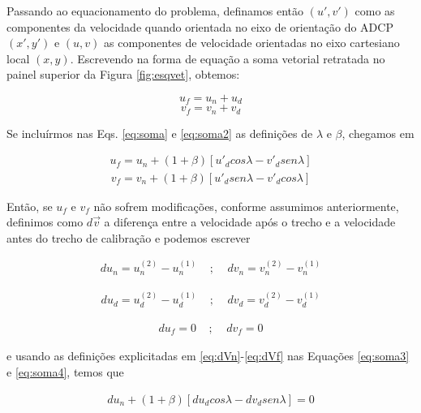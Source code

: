  Passando ao equacionamento do problema, definamos então $(u',v')$ como
as componentes da velocidade quando orientada no eixo de orientação do ADCP $(x',y')$ e $(u,v)$ as componentes de velocidade
orientadas no eixo cartesiano local $(x,y)$. Escrevendo na forma de equação a soma vetorial retratada no painel superior da 
Figura \ref{fig:esqvet}, obtemos: 

\begin{equation}
 u_f = u_n + u_d 
 \label{eq:soma}
\end{equation}
\begin{equation}
 v_f = v_n + v_d
 \label{eq:soma2}
\end{equation}

Se incluírmos nas Eqs. \ref{eq:soma} e \ref{eq:soma2} as definições de  $\lambda$ e $\beta$, chegamos em 

\begin{eqnarray}
 u_f = u_n + (1+\beta)[u'_d cos \lambda - v'_d sen \lambda] 
 \label{eq:soma3}
\end{eqnarray}
\begin{eqnarray}
 v_f = v_n + (1+\beta)[u'_d sen \lambda - v'_d cos \lambda]
 \label{eq:soma4}
\end{eqnarray}

Então, se $u_f$ e $v_f$ não sofrem modificações, conforme assumimos anteriormente, definimos como $d\vec{v}$ a diferença entre
a velocidade após o trecho e a velocidade antes do trecho de calibração e podemos escrever

\begin{eqnarray}
 du_n = u_n^{(2)} - u_n^{(1)} \ \ \ \ \ ; \ \ \ \ \ dv_n = v_n^{(2)} - v_n^{(1)}
 \label{eq:dVn}
\end{eqnarray}

\begin{eqnarray}
 du_d = u_d^{(2)} - u_d^{(1)} \ \ \ \ \ ; \ \ \ \ \ dv_d = v_d^{(2)} - v_d^{(1)}
 \label{eq:dVd}
\end{eqnarray}

\begin{eqnarray}
 du_f = 0 \ \ \ \ \ ; \ \ \ \ \ dv_f = 0
 \label{eq:dVf}
\end{eqnarray}

e usando as definições explicitadas em \ref{eq:dVn}-\ref{eq:dVf} nas Equações \ref{eq:soma3} e \ref{eq:soma4}, temos que 

\begin{eqnarray}
 du_n + (1+\beta)[du_d cos\lambda - dv_d sen \lambda] = 0
 \label{eq:du}
\end{eqnarray}

